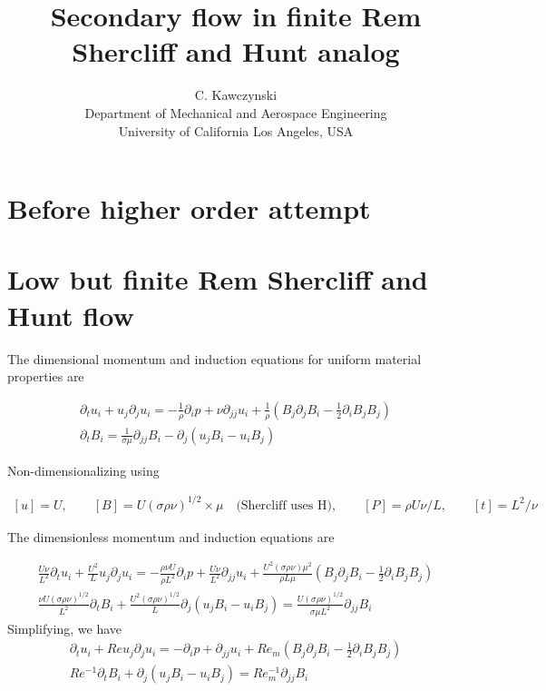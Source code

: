 \documentclass[11pt]{article}
\newcommand{\PD}{\partial}
\begin{document}
\doublespacing
\title{Secondary flow in finite Rem Shercliff and Hunt analog}
\author{C. Kawczynski \\
Department of Mechanical and Aerospace Engineering \\
University of California Los Angeles, USA\\
}
\maketitle

\section{Before higher order attempt}
\section{Low but finite Rem Shercliff and Hunt flow}
The dimensional momentum and induction equations for uniform material properties are

\begin{equation}\begin{aligned}
\PD_t u_i+u_j\PD_j u_i = -\frac{1}{\rho} \PD_i p+ \nu \PD_{jj} u_i + \frac{1}{\rho} (B_j \PD_j B_i - \tfrac{1}{2} \PD_i B_j B_j) \\
\PD_t B_i = \frac{1}{\sigma \mu} \PD_{jj} B_i - \PD_j (u_j B_i - u_i B_j)
\end{aligned} \end{equation}

Non-dimensionalizing using

\begin{equation}\begin{aligned}
	[u] = U, \qquad
	[B] = U (\sigma \rho \nu)^{1/2} \times \mu \quad \text{(Shercliff uses H)}, \qquad
	[P] = \rho U \nu / L, \qquad
	[t] = L^2 / \nu
\end{aligned} \end{equation}

The dimensionless momentum and induction equations are

\begin{equation}\begin{aligned}
\frac{U \nu}{L^2} \PD_t u_i+ \frac{U^2}{L} u_j\PD_j u_i =-\frac{\rho \nu U}{\rho L^2}\PD_i p+ \frac{U \nu}{L^2} \PD_{jj} u_i + \frac{U^2 (\sigma \rho \nu) \mu^2}{\rho L \mu} (B_j \PD_j B_i - \tfrac{1}{2} \PD_i B_j B_j) \\
\frac{\nu U (\sigma \rho \nu)^{1/2}}{L^2} \PD_t B_i + \frac{U^2 (\sigma \rho \nu)^{1/2}}{L} \PD_j (u_j B_i - u_i B_j) = \frac{U (\sigma \rho \nu)^{1/2}}{\sigma \mu L^2} \PD_{jj} B_i
\end{aligned} \end{equation}
Simplifying, we have
\begin{equation}\begin{aligned}
\PD_t u_i+ Re u_j\PD_j u_i =-\PD_i p+ \PD_{jj} u_i + Re_m (B_j \PD_j B_i - \tfrac{1}{2} \PD_i B_j B_j) \\
Re^{-1} \PD_t B_i + \PD_j (u_j B_i - u_i B_j) = Re_m^{-1} \PD_{jj} B_i
\end{aligned} \end{equation}
\end{document}
